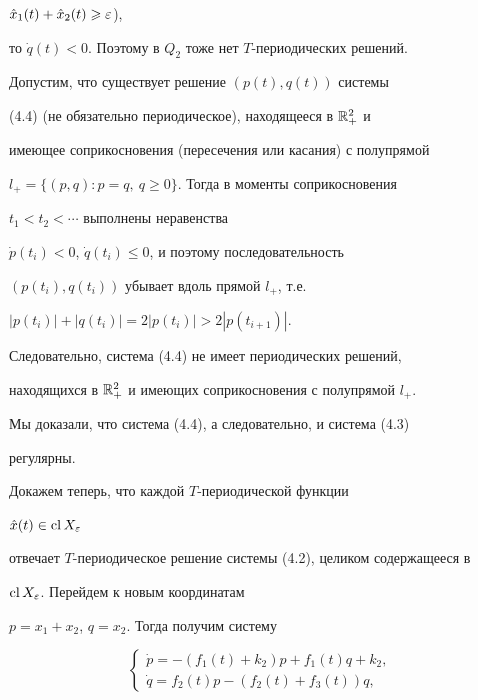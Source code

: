 $\Hat x_1(t) + \Hat x_2(t) \geqslant \varepsilon$),


то $\Dot q(t) < 0$. Поэтому в $Q_2$ тоже нет $T$-периодических решений.





Допустим, что существует решение $(p(t),q(t))$ системы


(4.4) (не обязательно периодическое), находящееся в $\Bbb R_{+}^2$ и


имеющее соприкосновения (пересечения или касания) с полупрямой


$l_{+}=\{(p,q): p=q,\ q\ge 0\}$.  Тогда в моменты соприкосновения


$t_1 < t_2 < \dotsb $ выполнены неравенства


$\Dot p(t_i) < 0$, $\Dot q(t_i) \le 0$, и поэтому последовательность


$(p(t_i),q(t_i))$ убывает вдоль прямой $l_{+}$, т.е.


$|p(t_i)| + |q(t_i)| = 2|p(t_i)| > 2|p(t_{i+1})|$.


Следовательно, система (4.4) не имеет периодических решений,


находящихся в $\Bbb R_{+}^2$ и имеющих соприкосновения с полупрямой $l_{+}$.


Мы доказали, что система (4.4), а следовательно, и система (4.3)


регулярны.





Докажем теперь, что каждой $T$-периодической функции


$\Hat x(t) \in\operatorname{cl} X_{\varepsilon}$


отвечает $T$-периодическое решение системы (4.2), целиком содержащееся в


$\operatorname{cl} X_{\varepsilon}$. Перейдем к новым координатам


$p = x_1 + x_2$, $q = x_2$. Тогда получим систему


%


\begin{equation}


\begin{cases}


\Dot p= - (f_1(t) + k_2)p + f_1(t)q + k_2, \\


\Dot q= f_2(t)p - (f_2(t) + f_3(t))q,


\end{cases}


\end{equation}


